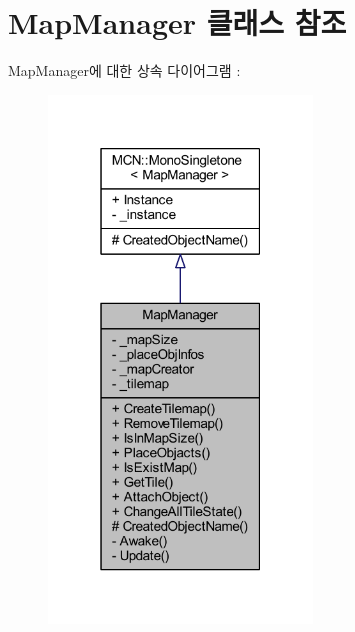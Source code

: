 \hypertarget{class_map_manager}{}\section{Map\+Manager 클래스 참조}
\label{class_map_manager}


Map\+Manager에 대한 상속 다이어그램 \+: \nopagebreak
\begin{figure}[H]
\begin{center}
\leavevmode
\includegraphics[width=199pt]{class_map_manager__inherit__graph}
\end{center}
\end{figure}


